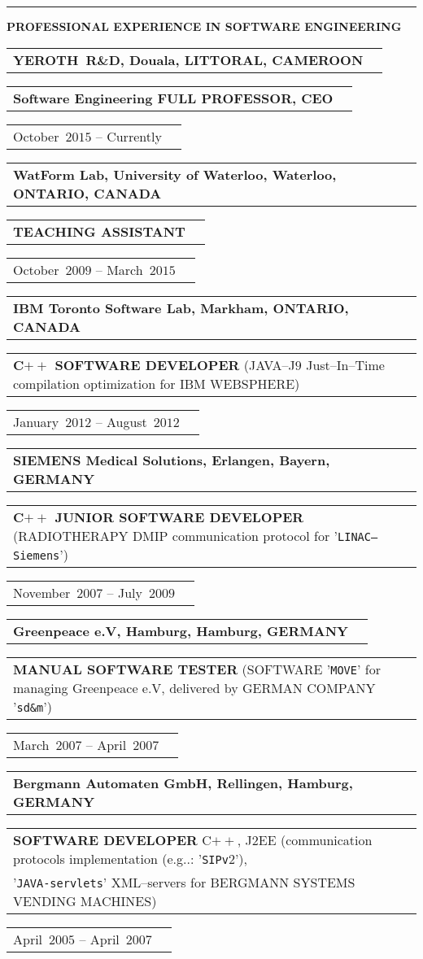 \documentclass[9pt,a4paper]{article} %
\makeatletter
\newcommand{\headerrow}[2]
{\begin{tabular*}{\linewidth}{l@{\extracolsep{\fill}}r}
	#1 &
	#2 \\
\end{tabular*}}
\newcommand{\headerrowONE}[1]{\headerrow{#1}{}}
\newcommand{\cplusplus}{C$++$\xspace}
\newcommand{\jtwoee}{J$2$EE\xspace}
\newcommand{\cvitemdate}[2]{#1~$#2$\xspace}
\newcommand{\cvitempositionheld}[1]{\textbf{#1}\xspace}
\makeatother
\begin{document}
\vspace{1em}


\hrule
\begin{center}
{\large \textbf{PROFESSIONAL EXPERIENCE IN SOFTWARE ENGINEERING}}
\end{center}

\vspace{0.5em}

\headerrowONE{\textbf{YEROTH~R\&D, Douala, LITTORAL, CAMEROON}}
\headerrowONE{\cvitempositionheld{Software Engineering FULL PROFESSOR, CEO}}
\headerrowONE{\cvitemdate{October}{2015} -- Currently}	

\vspace{0.3em}

\headerrowONE{\textbf{WatForm Lab, University of Waterloo, Waterloo, ONTARIO, CANADA}}	
\headerrowONE{\cvitempositionheld{TEACHING ASSISTANT}}
\headerrowONE{\cvitemdate{October}{2009} -- \cvitemdate{March}{2015}}
	
\vspace{0.3em}

\headerrowONE{\textbf{IBM Toronto Software Lab, Markham, ONTARIO, CANADA}}	
\headerrowONE{\cvitempositionheld{\cplusplus SOFTWARE DEVELOPER} (JAVA--J$9$ Just--In--Time compilation
optimization for IBM WEBSPHERE)}
\headerrowONE{\cvitemdate{January}{2012} -- \cvitemdate{August}{2012}}	

\vspace{0.3em}

\headerrowONE{\textbf{SIEMENS Medical Solutions, Erlangen, Bayern, GERMANY}}	
\headerrowONE{\cvitempositionheld{\cplusplus JUNIOR SOFTWARE DEVELOPER} (RADIOTHERAPY DMIP
communication protocol for '\texttt{LINAC--Siemens}')}
\headerrowONE{\cvitemdate{November}{2007} -- \cvitemdate{July}{2009}}	
	
\vspace{0.3em}

\headerrowONE{\textbf{Greenpeace e.V, Hamburg, Hamburg, GERMANY}}	
\headerrowONE{\cvitempositionheld{MANUAL SOFTWARE TESTER} 
(SOFTWARE '\texttt{MOVE}' for managing Greenpeace e.V, delivered by GERMAN COMPANY '\texttt{sd\&m}')}
\headerrowONE{\cvitemdate{March}{2007} -- \cvitemdate{April}{2007}}	

\vspace{0.3em}
\headerrowONE{\textbf{Bergmann Automaten GmbH, Rellingen, Hamburg, GERMANY}}	
\headerrowONE{\cvitempositionheld{SOFTWARE DEVELOPER} \cplusplus, \jtwoee 
(communication protocols implementation (e.g..: '\texttt{SIPv$2$}'), \\
'\texttt{JAVA-servlets}' XML--servers for BERGMANN SYSTEMS VENDING MACHINES)}
\headerrowONE{\cvitemdate{April}{2005} -- \cvitemdate{April}{2007}}	
	
\end{document}
